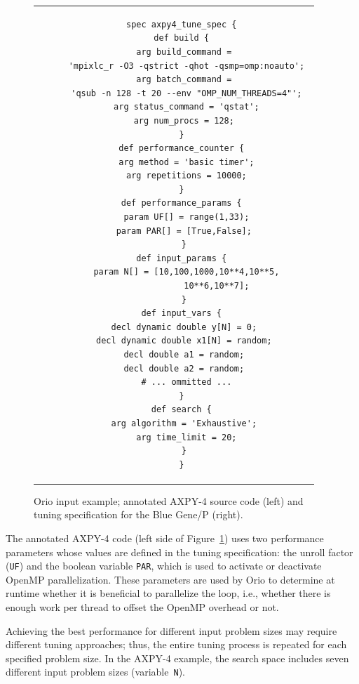 \begin{figure}
\begin{tabular}{cc}
\begin{minipage}{.5\textwidth}
\begin{verbatim}
\end{verbatim}  
\end{minipage}
&
\begin{minipage}{.5\textwidth}  
\scriptsize
\begin{verbatim}  
 spec axpy4_tune_spec {
  def build { 
   arg build_command = 
    'mpixlc_r -O3 -qstrict -qhot -qsmp=omp:noauto'; 
   arg batch_command = 
    'qsub -n 128 -t 20 --env "OMP_NUM_THREADS=4"'; 
   arg status_command = 'qstat';
   arg num_procs = 128; 
  } 
  def performance_counter { 
   arg method = 'basic timer';
   arg repetitions = 10000;
  } 
  def performance_params { 
   param UF[] = range(1,33);
   param PAR[] = [True,False]; 
  }
  def input_params { 
   param N[] = [10,100,1000,10**4,10**5,
                10**6,10**7]; 
  }
  def input_vars { 
   decl dynamic double y[N] = 0; 
   decl dynamic double x1[N] = random; 
   decl double a1 = random; 
   decl double a2 = random; 
   # ... ommitted ...
  } 
  def search { 
   arg algorithm = 'Exhaustive'; 
   arg time_limit = 20;
  }
 }
\end{verbatim}  
\end{minipage}
\\
\end{tabular}
\caption{Orio input example; annotated AXPY-4 source code (left) and tuning specification for the Blue Gene/P (right).}
\label{fig:orio-example}  
\end{figure} 

The annotated AXPY-4 code (left side of Figure~\ref{fig:orio-example}) uses two
performance parameters whose values are defined in the tuning specification:
the unroll factor (\texttt{UF})
and the boolean variable \texttt{PAR}, which is used to activate or
deactivate OpenMP parallelization. 
These parameters are used by Orio to determine at runtime whether it is
beneficial to parallelize the loop, i.e., whether there is enough work per
thread to offset the OpenMP overhead or not.

Achieving the best performance for different input problem sizes may require
different tuning approaches; thus, the entire tuning process is
repeated for each specified problem size. In the AXPY-4 example, the search
space includes seven different input problem sizes (variable~\texttt{N}). 

